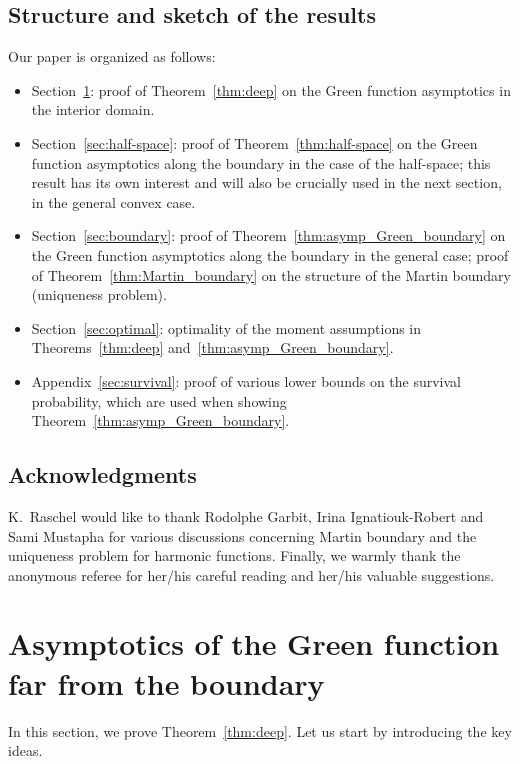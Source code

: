 \documentclass[10pt]{amsart}
\theoremstyle{definition}\newtheorem{defi}[theo]{Definition}\newtheorem{rema}[theo]{Remark}\newtheorem{exam}[theo]{Example}\newtheorem{exem}[theo]{Example}\newtheorem{nota}[theo]{Notation}
\begin{document}
\subsection*{Structure and sketch of the results} Our paper is organized as follows:
\begin{itemize}
\item Section~\ref{sec:interior}: proof of Theorem~\ref{thm:deep} on the Green function asymptotics in the interior domain.
\item Section~\ref{sec:half-space}: proof of Theorem~\ref{thm:half-space} on the Green function asymptotics along the boundary in the case of the half-space; this result has its own interest and will also be crucially used in the next section, in the general convex case.
\item Section~\ref{sec:boundary}: proof of Theorem~\ref{thm:asymp_Green_boundary} on the Green function asymptotics along the boundary in the general case; proof of Theorem~\ref{thm:Martin_boundary} on the structure of the Martin boundary (uniqueness problem).
\item Section~\ref{sec:optimal}: optimality of the moment assumptions in Theorems~\ref{thm:deep} and~\ref{thm:asymp_Green_boundary}.
\item Appendix~\ref{sec:survival}: proof of various lower bounds on the survival probability, which are used when showing Theorem~\ref{thm:asymp_Green_boundary}.
\end{itemize}


\subsection*{Acknowledgments}
K.~Raschel would like to thank Rodolphe Garbit, Irina Ignatiouk-Robert and Sami Mustapha for various discussions concerning Martin boundary and the uniqueness problem for harmonic functions. Finally, we warmly thank the anonymous referee for her/his careful reading and her/his valuable suggestions.



\section{Asymptotics of the Green function far from the boundary}\label{sec:interior}

In this section, we prove Theorem~\ref{thm:deep}. Let us start by introducing the key ideas.
\end{document}
